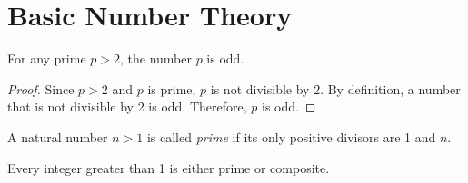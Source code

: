 \documentclass{article}
\begin{document}
\section{Basic Number Theory}

\begin{theorem}
For any prime $p > 2$, the number $p$ is odd.
\end{theorem}

\begin{proof}
Since $p > 2$ and $p$ is prime, $p$ is not divisible by 2.
By definition, a number that is not divisible by 2 is odd.
Therefore, $p$ is odd.
\end{proof}

\begin{definition}
A natural number $n > 1$ is called \emph{prime} if its only positive divisors are 1 and $n$.
\end{definition}

\begin{lemma}
Every integer greater than 1 is either prime or composite.
\end{lemma}
\end{document}
